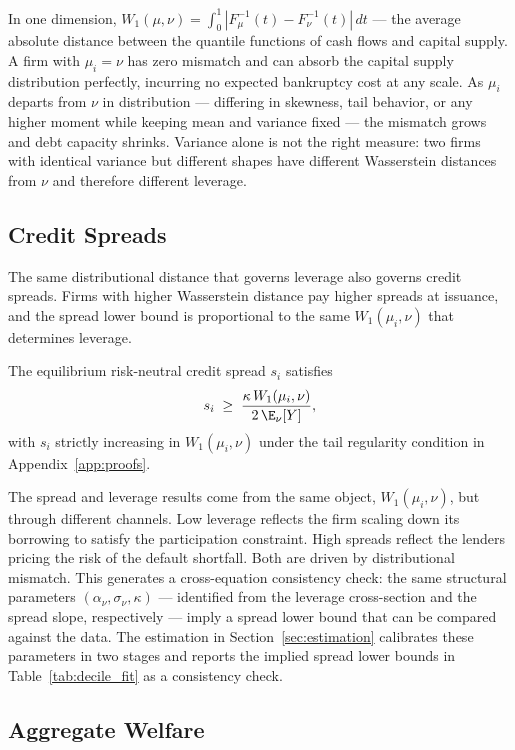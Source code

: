 In one dimension, $W_1(\mu,\nu) = \int_0^1 |F_\mu^{-1}(t) - F_\nu^{-1}(t)|\,dt$ — the average absolute distance between the quantile functions of cash flows and capital supply. A firm with $\mu_i = \nu$ has zero mismatch and can absorb the capital supply distribution perfectly, incurring no expected bankruptcy cost at any scale. As $\mu_i$ departs from $\nu$ in distribution — differing in skewness, tail behavior, or any higher moment while keeping mean and variance fixed — the mismatch grows and debt capacity shrinks. Variance alone is not the right measure: two firms with identical variance but different shapes have different Wasserstein distances from $\nu$ and therefore different leverage.

\subsection{Credit Spreads}

The same distributional distance that governs leverage also governs credit spreads. Firms with higher Wasserstein distance pay higher spreads at issuance, and the spread lower bound is proportional to the same $W_1(\mu_i,\nu)$ that determines leverage.

\begin{proposition}
\label{prop:spreads}
The equilibrium risk-neutral credit spread $s_i$ satisfies
\[
  s_i \;\geq\; \frac{\kappa\,W_1(\mu_i,\nu)}{2\,\E_\nu[Y]},
\]
with $s_i$ strictly increasing in $W_1(\mu_i,\nu)$ under the tail regularity condition in Appendix~\ref{app:proofs}.
\end{proposition}

The spread and leverage results come from the same object, $W_1(\mu_i,\nu)$, but through different channels. Low leverage reflects the firm scaling down its borrowing to satisfy the participation constraint. High spreads reflect the lenders pricing the risk of the default shortfall. Both are driven by distributional mismatch. This generates a cross-equation consistency check: the same structural parameters $(\alpha_\nu, \sigma_\nu, \kappa)$ — identified from the leverage cross-section and the spread slope, respectively — imply a spread lower bound that can be compared against the data. The estimation in Section~\ref{sec:estimation} calibrates these parameters in two stages and reports the implied spread lower bounds in Table~\ref{tab:decile_fit} as a consistency check.

\subsection{Aggregate Welfare}


